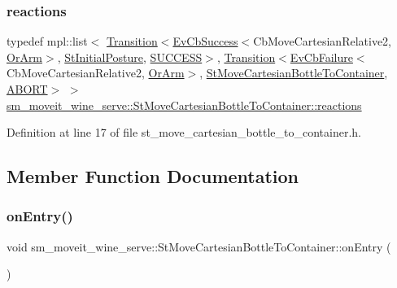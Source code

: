 \subsubsection{\texorpdfstring{reactions}{reactions}}
{\footnotesize\ttfamily typedef mpl\+::list$<$ \hyperlink{classsmacc_1_1Transition}{Transition}$<$\hyperlink{structsmacc_1_1EvCbSuccess}{Ev\+Cb\+Success}$<$Cb\+Move\+Cartesian\+Relative2, \hyperlink{classsm__moveit__wine__serve_1_1OrArm}{Or\+Arm}$>$, \hyperlink{structsm__moveit__wine__serve_1_1StInitialPosture}{St\+Initial\+Posture}, \hyperlink{structsmacc_1_1default__transition__tags_1_1SUCCESS}{S\+U\+C\+C\+E\+SS}$>$, \hyperlink{classsmacc_1_1Transition}{Transition}$<$\hyperlink{structsmacc_1_1EvCbFailure}{Ev\+Cb\+Failure}$<$Cb\+Move\+Cartesian\+Relative2, \hyperlink{classsm__moveit__wine__serve_1_1OrArm}{Or\+Arm}$>$, \hyperlink{structsm__moveit__wine__serve_1_1StMoveCartesianBottleToContainer}{St\+Move\+Cartesian\+Bottle\+To\+Container}, \hyperlink{structsmacc_1_1default__transition__tags_1_1ABORT}{A\+B\+O\+RT}$>$ $>$ \hyperlink{structsm__moveit__wine__serve_1_1StMoveCartesianBottleToContainer_a2350684d3e94c8b2713c13a0ecc73de8}{sm\+\_\+moveit\+\_\+wine\+\_\+serve\+::\+St\+Move\+Cartesian\+Bottle\+To\+Container\+::reactions}}



Definition at line 17 of file st\+\_\+move\+\_\+cartesian\+\_\+bottle\+\_\+to\+\_\+container.\+h.



\subsection{Member Function Documentation}
\mbox{\label{structsm__moveit__wine__serve_1_1StMoveCartesianBottleToContainer_a79b8a9867db4956c3872d5ca4da7c93f}} 
\subsubsection{\texorpdfstring{on\+Entry()}{onEntry()}}
{\footnotesize\ttfamily void sm\+\_\+moveit\+\_\+wine\+\_\+serve\+::\+St\+Move\+Cartesian\+Bottle\+To\+Container\+::on\+Entry (\begin{DoxyParamCaption}{ }\end{DoxyParamCaption})\hspace{0.3cm}{\ttfamily [inline]}}



